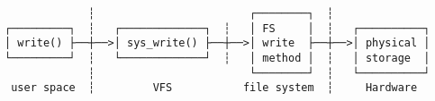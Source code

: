 \documentclass[varwidth=50em,crop]{standalone}
\begin{document}
\begin{verbatim}
             ┆                        ┌────────┐  ┆    
┌─────────┐  ┆   ┌─────────────┐  ┆   │ FS     │  ┆   ┌──────────┐
│ write() ├──┼──>│ sys_write() ├──┼──>│ write  ├──┼──>│ physical │
└─────────┘  ┆   └─────────────┘  ┆   │ method │  ┆   │ storage  │
             ┆                        └────────┘  ┆   └──────────┘
 user space  ┆         VFS           file system  ┆     Hardware
\end{verbatim}
\end{document}
